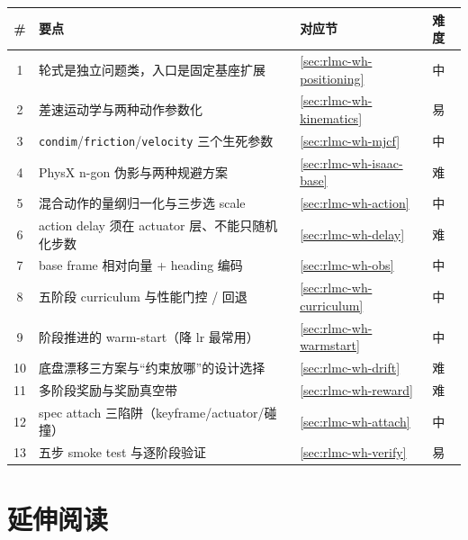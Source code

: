 \begin{center}
\small
\begin{tabular}{@{}clll@{}}
\toprule
\# & 要点 & 对应节 & 难度 \\
\midrule
1 & 轮式是独立问题类，入口是固定基座扩展 & \cref{sec:rlmc-wh-positioning} & 中 \\
2 & 差速运动学与两种动作参数化 & \cref{sec:rlmc-wh-kinematics} & 易 \\
3 & \verb|condim|/\allowbreak\verb|friction|/\allowbreak\verb|velocity| 三个生死参数 & \cref{sec:rlmc-wh-mjcf} & 中 \\
4 & PhysX n-gon 伪影与两种规避方案 & \cref{sec:rlmc-wh-isaac-base} & 难 \\
5 & 混合动作的量纲归一化与三步选 scale & \cref{sec:rlmc-wh-action} & 中 \\
6 & action delay 须在 actuator 层、不能只随机化步数 & \cref{sec:rlmc-wh-delay} & 难 \\
7 & base frame 相对向量 + heading 编码 & \cref{sec:rlmc-wh-obs} & 中 \\
8 & 五阶段 curriculum 与性能门控 / 回退 & \cref{sec:rlmc-wh-curriculum} & 中 \\
9 & 阶段推进的 warm-start（降 lr 最常用） & \cref{sec:rlmc-wh-warmstart} & 中 \\
10 & 底盘漂移三方案与“约束放哪”的设计选择 & \cref{sec:rlmc-wh-drift} & 难 \\
11 & 多阶段奖励与奖励真空带 & \cref{sec:rlmc-wh-reward} & 难 \\
12 & spec attach 三陷阱（keyframe/actuator/碰撞） & \cref{sec:rlmc-wh-attach} & 中 \\
13 & 五步 smoke test 与逐阶段验证 & \cref{sec:rlmc-wh-verify} & 易 \\
\bottomrule
\end{tabular}
\end{center}

\section{延伸阅读}
\label{sec:rlmc-wh-reading}

